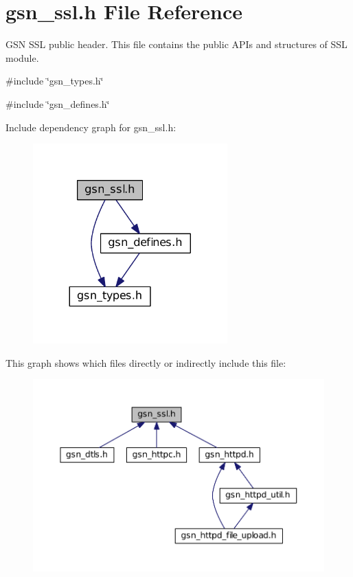 \hypertarget{a00590}{
\section{gsn\_\-ssl.h File Reference}
\label{a00590}
}


GSN SSL public header. This file contains the public APIs and structures of SSL module.  


{\ttfamily \#include \char`\"{}gsn\_\-types.h\char`\"{}}\par
{\ttfamily \#include \char`\"{}gsn\_\-defines.h\char`\"{}}\par
Include dependency graph for gsn\_\-ssl.h:
\nopagebreak
\begin{figure}[H]
\begin{center}
\leavevmode
\includegraphics[width=212pt]{a00832}
\end{center}
\end{figure}
This graph shows which files directly or indirectly include this file:
\nopagebreak
\begin{figure}[H]
\begin{center}
\leavevmode
\includegraphics[width=400pt]{a00833}
\end{center}
\end{figure}
